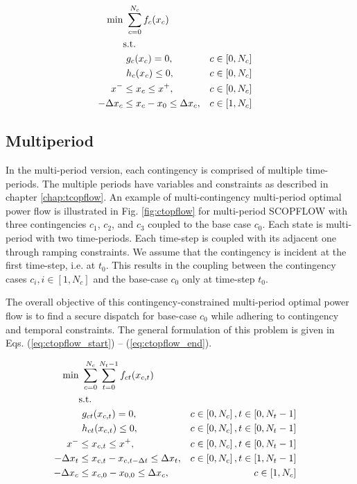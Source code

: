 \begin{align}
\centering
\text{min}&~\sum_{c=0}^{N_c}f_c(x_c)&  \label{eq:scopflow_start}\\
&\text{s.t.}& \nonumber \\
&~g_c(x_c) = 0,                             &c \in \left[0,N_c\right]& \\
&~h_c(x_c) \le 0,                           &c \in \left[0,N_c\right]& \\
x^- & \le x_c \le x^+,                     &c\in \left[0,N_c\right]& \\
-\Delta x_c & \le x_c - x_0 \le \Delta x_c,&c \in \left[1,N_c\right]&
\label{eq:scopflow_end}
\end{align}

\subsection{Multiperiod}

In the multi-period version, each contingency is comprised of multiple time-periods. The multiple periods have variables and constraints as described in chapter \ref{chap:tcopflow}. An example of multi-contingency multi-period optimal power flow is illustrated in Fig. \ref{fig:ctopflow} for multi-period SCOPFLOW with three contingencies $c_1$, $c_2$, and $c_3$ coupled to the base case $c_0$. Each state is multi-period with two time-periods. Each time-step is coupled with its adjacent one through ramping constraints. We assume that the contingency is incident at the first time-step, i.e. at $t_0$. This results in the coupling between the contingency cases $c_i, i \in [1,N_c]$ and the base-case $c_0$ only at time-step $t_0$.



The overall objective of this contingency-constrained multi-period optimal power flow is to find a secure dispatch for base-case $c_0$ while adhering to contingency and temporal constraints. The general formulation of this problem is given in Eqs. (\ref{eq:ctopflow_start}) -- (\ref{eq:ctopflow_end}).

\begin{align}
\centering
\text{min}&~\sum_{c=0}^{N_c}\sum_{t=0}^{N_t-1}f_{ct}(x_{c,t})& \label{eq:ctopflow_start}\\
&\text{s.t.}& \nonumber \\
&~g_{ct}(x_{c,t}) = 0,                                        &c \in \left[0,N_c\right], t \in \left[0,N_t-1\right]& \\
&~h_{ct}(x_{c,t}) \le 0,                                      &c \in \left[0,N_c\right], t \in \left[0,N_t-1\right]& \\
x^- & \le x_{c,t} \le x^+,                               &c \in \left[0,N_c\right], t\in \left[0,N_t-1\right]& \\
-\Delta x_t & \le x_{c,t} - x_{c,t-\Delta{t}} \le \Delta x_t,&c \in \left[0,N_c\right], t \in \left[1,N_t-1\right]& \label{eq:ctopflow_time_coupling}\\
-\Delta x_c & \le x_{c,0} - x_{0,0} \le \Delta x_c,&c \in \left[1,N_c\right]& \\
\label{eq:ctopflow_end}
\end{align}

